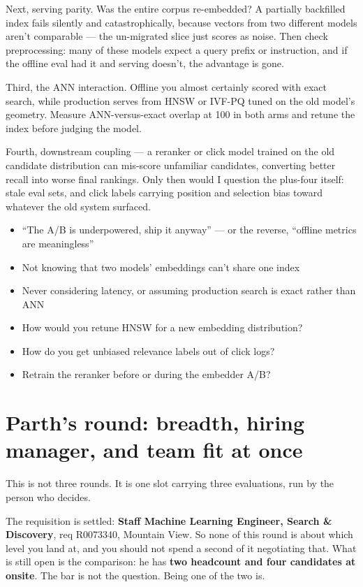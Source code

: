 \documentclass[10pt,twoside]{book}
\newcommand{\cchapter}[1]{\chapter{#1}}
\newcommand{\lab}[1]{\par\vspace{5pt}\noindent{\sffamily\footnotesize\bfseries\color{accent}#1}\par\vspace{1pt}}
\newcommand{\flab}[1]{\par\vspace{5pt}\noindent{\sffamily\footnotesize\bfseries\color{flag}#1}\par\vspace{1pt}}
\newcommand{\qsep}{\vspace{3pt}\noindent{\color{muted}\rule{\linewidth}{0.3pt}}}
\begin{document}
Next, serving parity. Was the entire corpus re-embedded? A partially backfilled index fails silently and catastrophically, because vectors from two different models aren't comparable --- the un-migrated slice just scores as noise. Then check preprocessing: many of these models expect a query prefix or instruction, and if the offline eval had it and serving doesn't, the advantage is gone.\par\vspace{3pt}
Third, the ANN interaction. Offline you almost certainly scored with exact search, while production serves from HNSW or IVF-PQ tuned on the old model's geometry. Measure ANN-versus-exact overlap at 100 in both arms and retune the index before judging the model.\par\vspace{3pt}
Fourth, downstream coupling --- a reranker or click model trained on the old candidate distribution can mis-score unfamiliar candidates, converting better recall into worse final rankings. Only then would I question the plus-four itself: stale eval sets, and click labels carrying position and selection bias toward whatever the old system surfaced.\par\vspace{3pt}
\flab{Loses the signal}
\begin{itemize}
\item ``The A/B is underpowered, ship it anyway'' --- or the reverse, ``offline metrics are meaningless''
\item Not knowing that two models' embeddings can't share one index
\item Never considering latency, or assuming production search is exact rather than ANN
\end{itemize}
\lab{Then they ask}
\begin{itemize}
\item How would you retune HNSW for a new embedding distribution?
\item How do you get unbiased relevance labels out of click logs?
\item Retrain the reranker before or during the embedder A/B?
\end{itemize}
\qsep
\cchapter{Parth's round: breadth, hiring manager, and team fit at once}
This is not three rounds. It is one slot carrying three evaluations, run by the person who decides.\par
The requisition is settled: \textbf{Staff Machine Learning Engineer, Search \& Discovery}, req R0073340, Mountain View. So none of this round is about which level you land at, and you should not spend a second of it negotiating that. What is still open is the comparison: he has \textbf{two headcount and four candidates at onsite}. The bar is not the question. Being one of the two is.\par
\end{document}
